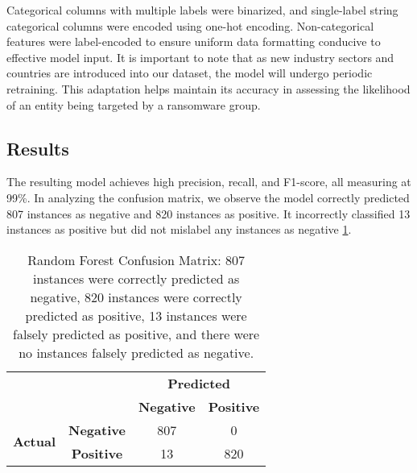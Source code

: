 \documentclass[running heads]{llncs}
\begin{document}
Categorical columns with multiple labels were binarized, and single-label string categorical columns were encoded using one-hot encoding. Non-categorical features were label-encoded to ensure uniform data formatting conducive to effective model input. It is important to note that as new industry sectors and countries are introduced into our dataset, the model will undergo periodic retraining. This adaptation helps maintain its accuracy in assessing the likelihood of an entity being targeted by a ransomware group.

\subsection{Results}

The resulting model achieves high precision, recall, and F1-score, all measuring at 99\%. In analyzing the confusion matrix, we observe the model correctly predicted 807 instances as negative and 820 instances as positive. It incorrectly classified 13 instances as positive but did not mislabel any instances as negative \ref{tab:confusion_matrix}.

\begin{table}[htbp]
  \centering
  \renewcommand{\arraystretch}{2} %
  \begin{tabular}{cc|c|c|}
    \cline{3-4}
    & & \multicolumn{2}{c|}{\textbf{Predicted}} \\ \cline{3-4} 
    & & \textbf{Negative} & \textbf{Positive} \\ \hline
    \multicolumn{1}{|c|}{\multirow{2}{*}{\textbf{Actual}}} & \textbf{Negative} & \hspace{8pt}807\hspace{8pt} & \hspace{8pt}0\hspace{8pt} \\ \cline{2-4} 
    \multicolumn{1}{|c|}{} & \textbf{Positive} & \hspace{8pt}13\hspace{8pt} & \hspace{8pt}820\hspace{8pt} \\ \hline
  \end{tabular}
    \vspace{10pt} %
    \caption{Random Forest Confusion Matrix: 807 instances were correctly predicted as negative, 820 instances were correctly predicted as positive, 13 instances were falsely predicted as positive, and there were no instances falsely predicted as negative.}
  \label{tab:confusion_matrix}
\end{table}
\end{document}
